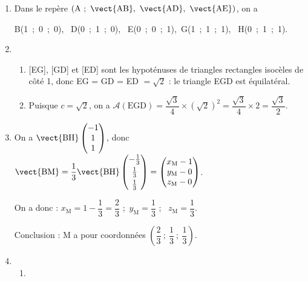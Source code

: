 \begin{enumerate}
\item %
Dans le repère $\left(\text{A}~;~\vect{\text{AB}},~\vect{\text{AD}},~\vect{\text{AE}}\right)$, on a 

B(1~;~0~;~0), \, D(0~;~1~;~0), \, E(0~;~0~;~1),\, G(1~;~1~;~1), \, H(0~;~1~;~1).
\item 
	\begin{enumerate}
		\item{}  %
[EG], [GD] et [ED] sont les hypoténuses de triangles rectangles isocèles de côté 1, donc EG = GD = ED $= \sqrt{2}$ : le triangle EGD est équilatéral.
		\item %
		
Puisque $c = \sqrt{2}$, on a $\mathcal{A}(\text{EGD}) = \dfrac{\sqrt{3}}{4}\times \left(\sqrt{2}\right)^2 = \dfrac{\sqrt{3}}{4}\times 2 = \dfrac{\sqrt{3}}{2}$.
	\end{enumerate}
	
\item %

On a $\vect{\text{BH}}\begin{pmatrix}- 1\\1\\1\end{pmatrix}$, donc $\vect{\text{BM}} = \dfrac{1}{3}\vect{\text{BH}}\begin{pmatrix}- \frac{1}{3}\\[3pt]\frac{1}{3}\\[3pt]\frac{1}{3}\end{pmatrix} = \begin{pmatrix}x_{\text{M}} - 1\\y_{\text{M}}- 0\\z_{\text{M}}- 0\end{pmatrix}$.

On a donc : 
$x_{\text{M}} = 1 - \dfrac{1}{3} = \dfrac{2}{3}$ ;\,
$y_{\text{M}} = \dfrac{1}{3} $ ; \,
$z_{\text{M}} = \dfrac{1}{3}$.

Conclusion : M a pour coordonnées $\left(\dfrac{2}{3}~;~\dfrac{1}{3}~; ~\dfrac{1}{3}\right)$.
\item
	\begin{enumerate}
		\item %
		

\end{enumerate}
\end{enumerate}
